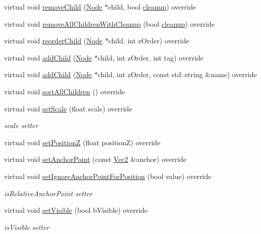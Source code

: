 \begin{Indent}
\begin{DoxyCompactItemize}
virtual void \hyperlink{classSprite_a64aee8360870f15193ad46565565a0f2}{remove\+Child} (\hyperlink{classNode}{Node} $\ast$child, bool \hyperlink{classNode_aa2de84c6cdeec9cd647d236c30ee0567}{cleanup}) override
\item 
virtual void \hyperlink{classSprite_a10eb2d2ae7c326487850cd1fec42382c}{remove\+All\+Children\+With\+Cleanup} (bool \hyperlink{classNode_aa2de84c6cdeec9cd647d236c30ee0567}{cleanup}) override
\item 
virtual void \hyperlink{classSprite_a128a1da95c110579928bdef1c3dacc78}{reorder\+Child} (\hyperlink{classNode}{Node} $\ast$child, int z\+Order) override
\item 
virtual void \hyperlink{classSprite_aad4985d58ef1bcd5bb0a21ad0601ebce}{add\+Child} (\hyperlink{classNode}{Node} $\ast$child, int z\+Order, int tag) override
\item 
virtual void \hyperlink{classSprite_a5ad9c89cdf0c494c0035c4e0f70465bf}{add\+Child} (\hyperlink{classNode}{Node} $\ast$child, int z\+Order, const std\+::string \&name) override
\item 
virtual void \hyperlink{classSprite_adf75ebee22c9ff3f4d72f99c86ff365c}{sort\+All\+Children} () override
\item 
virtual void \hyperlink{classSprite_a91251019ce74f40cc8d0f04a1dbf70c1}{set\+Scale} (float scale) override
\begin{DoxyCompactList}\small\item\em scale setter \end{DoxyCompactList}\item 
virtual void \hyperlink{classSprite_ac22643ba4c10444cce30e0f100bfb041}{set\+PositionZ} (float positionZ) override
\item 
virtual void \hyperlink{classSprite_ace1c8b1ba17bcf1086730e192b914a78}{set\+Anchor\+Point} (const \hyperlink{classVec2}{Vec2} \&anchor) override
\item 
virtual void \hyperlink{classSprite_a6cbc37c64ba7d2f0d37070c1c1a750ec}{set\+Ignore\+Anchor\+Point\+For\+Position} (bool value) override
\begin{DoxyCompactList}\small\item\em is\+Relative\+Anchor\+Point setter \end{DoxyCompactList}\item 
virtual void \hyperlink{classSprite_abdaaa50259a13af3d6e8effded4ba42b}{set\+Visible} (bool b\+Visible) override
\begin{DoxyCompactList}\small\item\em is\+Visible setter \end{DoxyCompactList}\item 

\end{DoxyCompactItemize}
\end{Indent}
